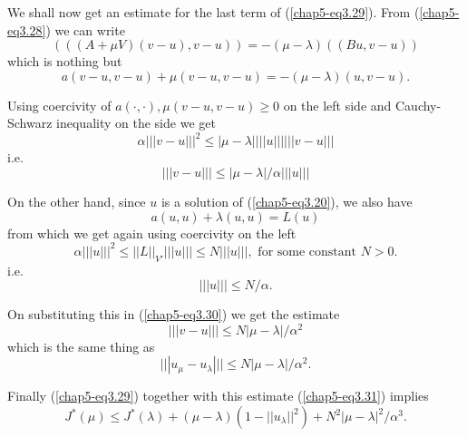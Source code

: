 We shall now get an estimate for the last term of (\ref{chap5-eq3.29}). From (\ref{chap5-eq3.28}) we can write
$$
(((A + \mu V)(v - u), v - u)) = -(\mu - \lambda)((Bu, v - u))
$$
which is nothing but
$$
a(v-u, v-u) + \mu(v-u, v-u) = -(\mu - \lambda)(u, v-u).
$$

Using coercivity of $a(\cdot , \cdot), \mu(v-u, v-u) \geq 0$ on the left side and Cauchy-Schwarz inequality on the side we get
$$
\alpha |||v-u|||^{2} \leq |\mu - \lambda| |||u||| |||v-u|||
$$
i.e. 
\begin{equation*}
||| v-u ||| \leq |\mu - \lambda| / \alpha |||u|||\tag{3.30}\label{chap5-eq3.30}
\end{equation*}

On the other hand, since $u$ is a solution of (\ref{chap5-eq3.20}), we also have
$$
a(u, u) + \lambda (u, u) = L(u)
$$
from which we get again using coercivity on the left
$$
\alpha |||u|||^{2} \leq ||L||_{V'} |||u||| \leq N |||u|||, \text{ for some constant } N > 0.
$$\pageoriginale
i.e. 
$$
|||u||| \leq N/ \alpha.
$$

On substituting this in (\ref{chap5-eq3.30}) we get the estimate
$$
|||v-u||| \leq N |\mu - \lambda| / \alpha^{2}
$$
which is the same thing as
\begin{equation*}
|||u_{\mu} - u_{\lambda}||| \leq N|\mu - \lambda| / \alpha^{2}.\tag{3.31}\label{chap5-eq3.31}
\end{equation*}

Finally (\ref{chap5-eq3.29}) together with this estimate (\ref{chap5-eq3.31}) implies 
\begin{equation*}
J^{*}(\mu) \leq J^{*}(\lambda) + (\mu - \lambda) (1 - ||u_{\lambda}||^{2}) + N^{2} |\mu - \lambda|^{2} / \alpha^{3}.\tag{3.32}\label{chap5-eq3.32}
\end{equation*}

\medskip
{}

